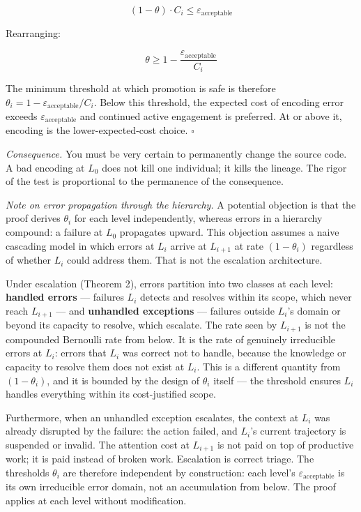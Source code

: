 \documentclass[
]{article}
\begin{document}
\[(1 - \theta) \cdot C_i \leq \varepsilon_{\text{acceptable}}\]

Rearranging:

\[\theta \geq 1 - \frac{\varepsilon_{\text{acceptable}}}{C_i}\]

The minimum threshold at which promotion is safe is therefore
\(\theta_i = 1 - \varepsilon_{\text{acceptable}}/C_i\). Below this
threshold, the expected cost of encoding error exceeds
\(\varepsilon_{\text{acceptable}}\) and continued active engagement is
preferred. At or above it, encoding is the lower-expected-cost choice.
\(\square\)

\emph{Consequence.} You must be very certain to permanently change the
source code. A bad encoding at \(L_0\) does not kill one individual; it
kills the lineage. The rigor of the test is proportional to the
permanence of the consequence.

\emph{Note on error propagation through the hierarchy.} A potential
objection is that the proof derives \(\theta_i\) for each level
independently, whereas errors in a hierarchy compound: a failure at
\(L_0\) propagates upward. This objection assumes a naive cascading
model in which errors at \(L_i\) arrive at \(L_{i+1}\) at rate
\((1-\theta_i)\) regardless of whether \(L_i\) could address them. That
is not the escalation architecture.

Under escalation (Theorem 2), errors partition into two classes at each
level: \textbf{handled errors} --- failures \(L_i\) detects and resolves
within its scope, which never reach \(L_{i+1}\) --- and
\textbf{unhandled exceptions} --- failures outside \(L_i\)'s domain or
beyond its capacity to resolve, which escalate. The rate seen by
\(L_{i+1}\) is not the compounded Bernoulli rate from below. It is the
rate of genuinely irreducible errors at \(L_i\): errors that \(L_i\) was
correct not to handle, because the knowledge or capacity to resolve them
does not exist at \(L_i\). This is a different quantity from
\((1-\theta_i)\), and it is bounded by the design of \(\theta_i\) itself
--- the threshold ensures \(L_i\) handles everything within its
cost-justified scope.

Furthermore, when an unhandled exception escalates, the context at
\(L_i\) was already disrupted by the failure: the action failed, and
\(L_i\)'s current trajectory is suspended or invalid. The attention cost
at \(L_{i+1}\) is not paid on top of productive work; it is paid instead
of broken work. Escalation is correct triage. The thresholds
\(\theta_i\) are therefore independent by construction: each level's
\(\varepsilon_{\text{acceptable}}\) is its own irreducible error domain,
not an accumulation from below. The proof applies at each level without
modification.
\end{document}
